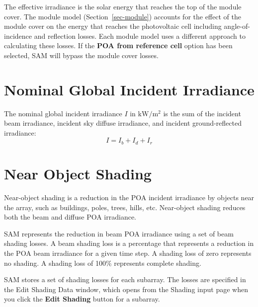 \documentclass[12pt,letterpaper]{article}
\begin{document}
The effective irradiance is the solar energy that reaches the top of the module cover. The module model (Section~\ref{sec-module}) accounts for the effect of the module cover on the energy that reaches the photovoltaic cell including angle-of-incidence and reflection losses. Each module model uses a different approach to calculating these losses. If the \textbf{POA from reference cell} option has been selected, SAM will bypass the module cover losses.

\section{Nominal Global Incident Irradiance}\label{sec-nominalincidentirradiance}

The nominal global incident irradiance $I$ in $\mathrm{kW/m^2}$ is the sum of the incident beam irradiance, incident sky diffuse irradiance, and incident ground-reflected irradiance:
\begin{equation}
I = I_{b} + I_{d} + I_{r}
\end{equation}

\section{Near Object Shading}\label{sec-nearobjectshad}

Near-object shading is a reduction in the POA incident irradiance by objects near the array, such as buildings, poles, trees, hills, etc. Near-object shading reduces both the beam and diffuse POA irradiance.

SAM represents the reduction in beam POA irradiance using a set of beam shading losses. A beam shading loss is a percentage that represents a reduction in the POA beam irradiance for a given time step. A shading loss of zero represents no shading. A shading loss of 100\% represents complete shading.

SAM stores a set of shading losses for each subarray. The losses are specified in the Edit Shading Data window, which opens from the Shading input page when you click the \textbf{Edit Shading} button for a subarray.
\end{document}
